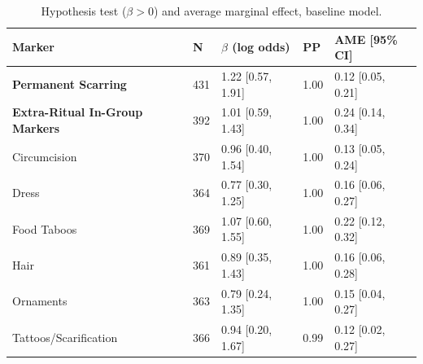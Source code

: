 \begin{table}[!ht]
\centering
\small
\caption{Hypothesis test ($\beta > 0$) and average marginal effect, baseline model.}
\label{tab:ext_hypothesis_ame_baseline}
\begin{tabular}{lllll}
\toprule
Marker & N & $\beta$ (log odds) & PP & AME [95\% CI] \\
\midrule
\textbf{Permanent Scarring} & 431 & 1.22 [0.57, 1.91] & 1.00 & 0.12 [0.05, 0.21] \\
\textbf{Extra-Ritual In-Group Markers} & 392 & 1.01 [0.59, 1.43] & 1.00 & 0.24 [0.14, 0.34] \\
\midrule
Circumcision & 370 & 0.96 [0.40, 1.54] & 1.00 & 0.13 [0.05, 0.24] \\
Dress & 364 & 0.77 [0.30, 1.25] & 1.00 & 0.16 [0.06, 0.27] \\
Food Taboos & 369 & 1.07 [0.60, 1.55] & 1.00 & 0.22 [0.12, 0.32] \\
Hair & 361 & 0.89 [0.35, 1.43] & 1.00 & 0.16 [0.06, 0.28] \\
Ornaments & 363 & 0.79 [0.24, 1.35] & 1.00 & 0.15 [0.04, 0.27] \\
Tattoos/Scarification & 366 & 0.94 [0.20, 1.67] & 0.99 & 0.12 [0.02, 0.27] \\
\bottomrule
\end{tabular}
\end{table}